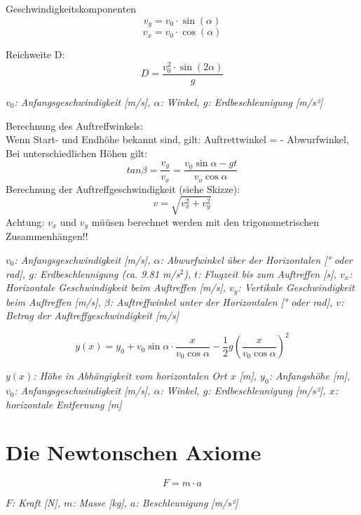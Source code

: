 \documentclass[a4paper,10pt]{article}
\newenvironment{displayformula}
{
	\begin{framed}
		\color{formulaColor}
	}
	{\end{framed}}
\newcommand{\formulalegend}[1]{%
	\par\vspace{0.5ex}%
	{{\color{legendColor}\RaggedRight\small\textit{#1}}}%
	\par\vspace{1.5ex}%
}
\begin{document}
\begin{displayformula}
	Geschwindigkeitskomponenten
	\[
	v_y = v_0 \cdot \sin (\alpha)
	\]
	\[
	v_x = v_0 \cdot \cos (\alpha)
	\]
\end{displayformula}

\begin{displayformula}
	Reichweite D:
	\[
	D = \frac{v_0^2 \cdot \sin (2 \alpha)}{g}
	\]
\end{displayformula}
\formulalegend{
\( v_0 \): Anfangsgeschwindigkeit [m/s], \( \alpha \): Winkel, \( g \): Erdbeschleunigung [m/s²]
}

\begin{displayformula}
	Berechnung des Auftreffwinkels: \\
	Wenn Start- und Endhöhe bekannt sind, gilt: Auftrettwinkel = - Abwurfwinkel, \\ Bei unterschiedlichen Höhen gilt:
	\[
	tan \beta = \frac{v_y}{v_x} = \frac{v_0 \sin \alpha - gt}{v_o \cos \alpha}
	\]
	Berechnung der Auftreffgeschwindigkeit (siehe Skizze):
	\[
	v = \sqrt{v_x^2 + v_y^2}
	\]
	Achtung: $v_x$ und $v_y$ müüsen berechnet werden mit den trigonometrischen Zusammenhängen!!
\end{displayformula}
\formulalegend{
	\( v_0 \): Anfangsgeschwindigkeit [m/s], 
	\( \alpha \): Abwurfwinkel über der Horizontalen [° oder rad], 
	\( g \): Erdbeschleunigung (ca. 9.81 m/s\(^2\)), 
	\( t \): Flugzeit bis zum Auftreffen [s], 
	\( v_x \): Horizontale Geschwindigkeit beim Auftreffen [m/s], 
	\( v_y \): Vertikale Geschwindigkeit beim Auftreffen [m/s], 
	\( \beta \): Auftreffwinkel unter der Horizontalen [° oder rad], 
	\( v \): Betrag der Auftreffgeschwindigkeit [m/s]
}



\begin{displayformula}
	\[
	y(x) = y_0 + v_0\sin\alpha \cdot \frac{x}{v_0 \cos\alpha} - \frac{1}{2} g \left(\frac{x}{v_0\cos\alpha}\right)^2
	\]
\end{displayformula}
\formulalegend{
	\( y(x) \): Höhe in Abhängigkeit vom horizontalen Ort \( x \) [m], \( y_0 \): Anfangshöhe [m], \( v_0 \): Anfangsgeschwindigkeit [m/s], \( \alpha \): Winkel, \( g \): Erdbeschleunigung [m/s²], \( x \): horizontale Entfernung [m]
}



\section{Die Newtonschen Axiome}

\begin{displayformula}
	\[
	F = m \cdot a
	\]
\end{displayformula}
\formulalegend{
	\( F \): Kraft [N], \( m \): Masse [kg], \( a \): Beschleunigung [m/s²]
}
\end{document}
